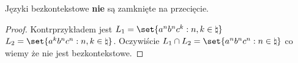 \begin{theorem}
    Języki bezkontekstowe \textbf{nie} są zamknięte na przecięcie.
\end{theorem}
\begin{proof}
    Kontrprzykładem jest \( L_1 = \set{a^nb^nc^k : n, k \in \natural} \) \( L_2 = \set{a^kb^nc^n : n, k \in \natural} \).
    Oczywiście \( L_1 \cap L_2 = \set{a^nb^nc^n : n \in \natural} \) co wiemy że nie jest bezkontekstowe.
\end{proof}